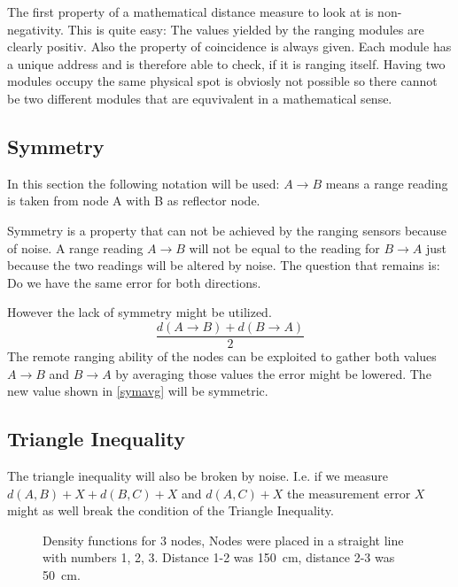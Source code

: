 The first property of a mathematical distance measure to look at is non-negativity. This is quite easy: The values yielded by the ranging modules are clearly positiv.
Also the property of coincidence is always given.
Each module has a unique address and is therefore able to check, if it is ranging itself.
Having two modules occupy the same physical spot is obviosly not possible so there cannot be two different modules that are equvivalent in a mathematical sense.

\subsection{Symmetry}

In this section the following notation will be used: $A \rightarrow B$ means a range reading is taken from node A with B as reflector node.

Symmetry is a property that can not be achieved by the ranging sensors because of noise. 
A range reading $A \rightarrow B$ will not be equal to the reading for $B \rightarrow A$ just because the two readings will be altered by noise.
The question that remains is: Do we have the same error for both directions.



However the lack of symmetry might be utilized.
\begin{equation}
\frac{ d(A \rightarrow B) + d(B \rightarrow A) }{2}
\label{symavg}
\end{equation}
The remote ranging ability of the nodes can be exploited to gather both values $A \rightarrow B$ and $B \rightarrow A$ by averaging those values the error might be lowered. 
The new value shown in \autoref{symavg} will be symmetric.

\subsection{Triangle Inequality}
The triangle inequality will also be broken by noise.
I.e. if we measure $d(A,B) + X + d(B,C) + X$ and $d(A, C) + X$ the measurement error $X$ might as well break the condition of the Triangle Inequality.

\begin{figure}[H]
	\centering
	
	\caption[Density functions for 3 nodes]{Density functions for 3 nodes, Nodes were placed in a straight line with numbers 1, 2, 3. Distance 1-2 was \SI{150}{cm}, distance 2-3 was \SI{50}{cm}. }
	\label{triangle}
\end{figure}


